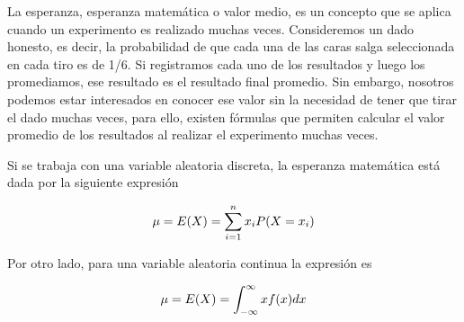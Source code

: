 \documentclass[
  11pt,
]{book}
\theoremstyle{definition}
\theoremstyle{definition}
\theoremstyle{definition}
\theoremstyle{definition}
\theoremstyle{remark}
\begin{document}
La esperanza, esperanza matemática o valor medio, es un concepto que se aplica cuando un experimento es realizado muchas veces. Consideremos un dado honesto, es decir, la probabilidad de que cada una de las caras salga seleccionada en cada tiro es de 1/6. Si registramos cada uno de los resultados y luego los promediamos, ese resultado es el resultado final promedio. Sin embargo, nosotros podemos estar interesados en conocer ese valor sin la necesidad de tener que tirar el dado muchas veces, para ello, existen fórmulas que permiten calcular el valor promedio de los resultados al realizar el experimento muchas veces.

Si se trabaja con una variable aleatoria discreta, la esperanza matemática está dada por la siguiente expresión

\begin{equation}
\notag
\mu = E(X) = \sum_{i=1}^n x_iP(X = x_i)
\end{equation}
\label{eq:esperanzadiscreta}

Por otro lado, para una variable aleatoria continua la expresión es

\begin{equation}
\notag
\mu = E(X) = \int_{-\infty}^{\infty} xf(x)dx
\label{eq:esperanazacontinua}
\end{equation}
\end{document}
